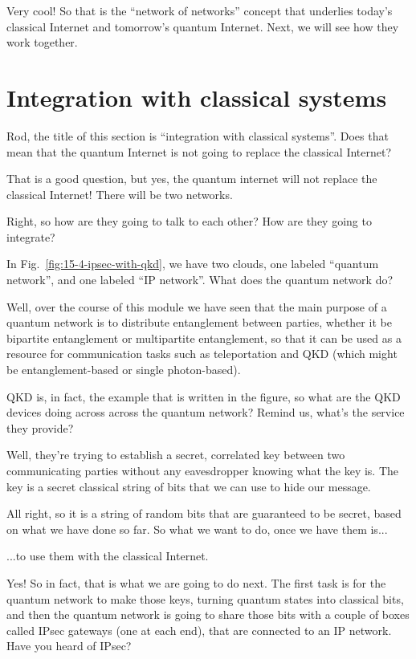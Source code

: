 \mmm Very cool! So that is the ``network of networks'' concept that underlies today's classical Internet and tomorrow's quantum Internet.  Next, we will see how they work together.



\section{Integration with classical systems}
\label{sec:classical-integration}

\mmm Rod, the title of this section is ``integration with classical systems''. Does that mean that the quantum Internet is not going to replace the classical Internet?

\rrr That is a good question, but yes, the quantum internet will not replace the classical Internet! There will be two networks.

\mmm Right, so how are they going to talk to each other? How are they going to integrate?

\rrr In Fig.~\ref{fig:15-4-ipsec-with-qkd}, we have two clouds, one labeled ``quantum network'', and one labeled ``IP network''. What does the quantum network do?

\mmm Well, over the course of this module we have seen that the main purpose of a quantum network is to distribute entanglement between parties, whether it be bipartite entanglement or multipartite entanglement, so that it can be used as a resource for communication tasks such as teleportation and QKD (which might be entanglement-based or single photon-based).

\rrr QKD is, in fact, the example that is written in the figure, so what are the QKD devices doing across across the quantum network? Remind us, what's the service they provide?

\mmm Well, they're trying to establish a secret, correlated key between two communicating parties without any eavesdropper knowing what the key is. The key is a secret classical string of bits that we can use to hide our message.

\rrr All right, so it is a string of random bits that are guaranteed to be secret, based on what we have done so far. So what we want to do, once we have them is...

\mmm ...to use them with the classical Internet.

\rrr Yes! So in fact, that is what we are going to do next. The first task is for the quantum network to make those keys, turning quantum states into classical bits, and then the quantum network is going to share those bits with a couple of boxes called IPsec gateways (one at each end), that are connected to an IP network. Have you heard of IPsec?

